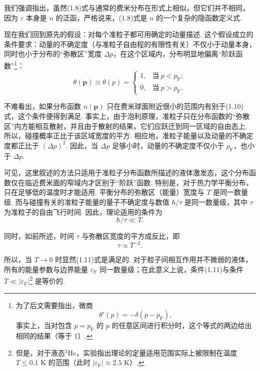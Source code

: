 我们强调指出，虽然(1.8)式与通常的费米分布在形式上相似，但它们并不相同，因为 $\varepsilon$ 本身是 $n$ 的泛函，严格说来，(1.8)式是 $n$ 的一个复杂的隐函数定义式.

现在我们回到原先的假设：对每个准粒子都可用确定的动量描述. 这个假设成立的条件要求：动量的不确定度（与准粒子自由程的有限性有关）不仅小于动量本身，同时也小于分布的“弥散区”宽度 $\Delta p$，在这个区域内，分布明显地偏离“阶跃函数”\footnote{为了后文需要指出，微商
\begin{equation*}
\theta'(p)=-\delta(p-p_{\mathrm F}),
\end{equation*}
事实上，当对包含 $p=p_{\mathrm F}$ 的 $p$ 的任意区间进行积分时，这个等式的两边给出相同的结果（等于 1）.}：
\begin{equation}
\theta(\bm p)\equiv\theta(p)=
\begin{cases}
1, & \text{当}\ p<p_{\mathrm F};\\
0, & \text{当}\ p>p_{\mathrm F}.
\end{cases}
\end{equation}

不难看出，如果分布函数 $n(\bm p)$ 只在费米球面附近很小的范围内有别于(1.10)式，这个条件便得到满足. 事实上，由于泡利原理，准粒子只在分布函数的“弥散区”内方能相互散射，并且由于散射的结果，它们应跃迁到同一区域的自由态上. 所以，碰撞概率正比于该区域宽度的平方. 相应地，准粒子能量以及动量的不确定度都正比于 $(\Delta p)^{2}$. 因此，当 $\Delta p$ 足够小时，动量的不确定度不仅小于 $p_{\mathrm F}$，也小于 $\Delta p$.

可见，这里叙述的方法只适用于准粒子分布函数所描述的液体激发态，这个分布函数仅在临近费米面的窄域内才区别于“阶跃”函数. 特别是，对于热力学平衡分布，只在足够低的温度时才能适用. 平衡分布的弥散区（能量）宽度与 $T$ 是同一数量级. 而与碰撞有关的准粒子能量的量子不确定度与数值 $\hbar/\tau$ 是同一数量级，其中 $\tau$ 为准粒子的自由飞行时间. 因此，理论适用的条件为
\begin{equation}
\hbar/\tau\ll T.
\end{equation}

同时，如前所述，时间 $\tau$ 与弥散区宽度的平方成反比，即
\begin{equation*}
\tau\propto T^{-2}.
\end{equation*}

所以，当 $T\to0$ 时显然(1.11)式是满足的. 对于粒子间相互作用并不微弱的液体，所有的能量参数与边界能量 $\varepsilon_{\mathrm F}$ 同一数量级；在此意义上说，条件(1.11)与条件 $T\ll|\varepsilon_{\mathrm F}|$\footnote{但是，对于液态$^{3}$He，实验指出理论的定量适用范围实际上被限制在温度 $T\leqslant0.1$ K 的范围（此时 $|\varepsilon_{\mathrm F}|\approx2.5$ K）.} 是等价的.


